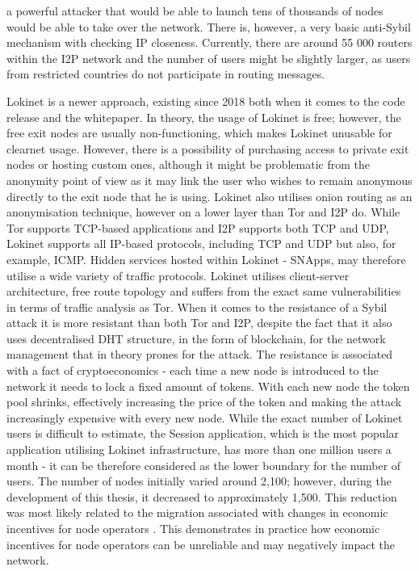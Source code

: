 a powerful attacker that would be able to launch tens of thousands of nodes would be able to take over the network. There is, however, a very basic anti-Sybil mechanism with checking IP closeness. Currently, there are around 55 000 routers within the I2P network and the number of users might be slightly larger, as users from restricted countries do not participate in routing messages. 

Lokinet is a newer approach, existing since 2018 both when it comes to the code release and the whitepaper. In theory, the usage of Lokinet is free; however, the free exit nodes are usually non-functioning, which makes Lokinet unusable for clearnet usage. However, there is a possibility of purchasing access to private exit nodes or hosting custom ones, although it might be problematic from the anonymity point of view as it may link the user who wishes to remain anonymous directly to the exit node that he is using. Lokinet also utilises onion routing as an anonymisation technique, however on a lower layer than Tor and I2P do. While Tor supports TCP-based applications and I2P supports both TCP and UDP, Lokinet supports all IP-based protocols, including TCP and UDP but also, for example, ICMP. Hidden services hosted within Lokinet - SNApps, may therefore utilise a wide variety of traffic protocols. Lokinet utilises client-server architecture, free route topology and suffers from the exact same vulnerabilities in terms of traffic analysis as Tor. When it comes to the resistance of a Sybil attack it is more resistant than both Tor and I2P, despite the fact that it also uses decentralised DHT structure, in the form of blockchain, for the network management that in theory prones for the attack. The resistance is associated with a fact of cryptoeconomics - each time a new node is introduced to the network it needs to lock a fixed amount of tokens. With each new node the token pool shrinks, effectively increasing the price of the token and making the attack increasingly expensive with every new node. While the exact number of Lokinet users is difficult to estimate, the Session application, which is the most popular application utilising Lokinet infrastructure, has more than one million users a month - it can be therefore considered as the lower boundary for the number of users. The number of nodes initially varied around 2,100; however, during the development of this thesis, it decreased to approximately 1,500. This reduction was most likely related to the migration associated with changes in economic incentives for node operators \cite{session-migration}. This demonstrates in practice how economic incentives for node operators can be unreliable and may negatively impact the network.

